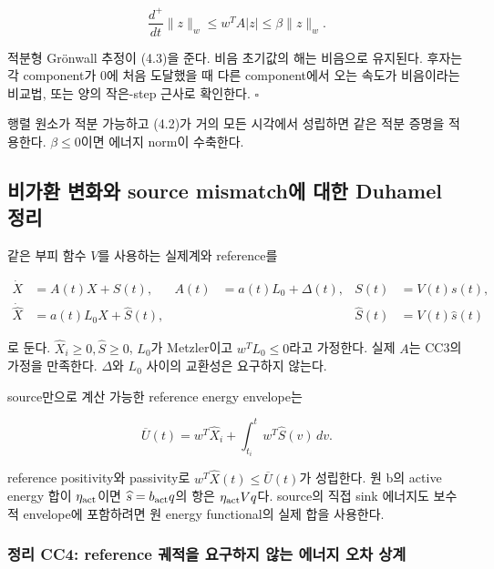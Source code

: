\[
\frac{d^+}{dt}\|z\|_w
\le w^TA|z|\le\beta\|z\|_w.
\]

적분형 Grönwall 추정이 (4.3)을 준다. 비음 초기값의 해는 비음으로 유지된다. 후자는 각 component가 0에 처음 도달했을 때 다른 component에서 오는 속도가 비음이라는 비교법, 또는 양의 작은-step 근사로 확인한다. \(\square\)

행렬 원소가 적분 가능하고 (4.2)가 거의 모든 시각에서 성립하면 같은 적분 증명을 적용한다. \(\beta\le0\)이면 에너지 norm이 수축한다.

\hypertarget{uxbe44uxac00uxd658-uxbcc0uxd654uxc640-source-mismatchuxc5d0-uxb300uxd55c-duhamel-uxc815uxb9ac}{%
\subsection{비가환 변화와 source mismatch에 대한 Duhamel 정리}\label{uxbe44uxac00uxd658-uxbcc0uxd654uxc640-source-mismatchuxc5d0-uxb300uxd55c-duhamel-uxc815uxb9ac}}

같은 부피 함수 \(V\)를 사용하는 실제계와 reference를

\[
\begin{aligned}
\dot X&=A(t)X+S(t),&
A(t)&=a(t)L_0+\Delta(t),&
S(t)&=V(t)s(t),\\
\dot{\widehat X}&=a(t)L_0\widehat X+\widehat S(t),&&&
\widehat S(t)&=V(t)\widehat s(t)
\end{aligned}
\tag{5.1}
\]

로 둔다. \(\widehat X_i\ge0,\widehat S\ge0\), \(L_0\)가 Metzler이고 \(w^TL_0\le0\)라고 가정한다. 실제 \(A\)는 CC3의 가정을 만족한다. \(\Delta\)와 \(L_0\) 사이의 교환성은 요구하지 않는다.

source만으로 계산 가능한 reference energy envelope는

\[
\boxed{
\overline U(t)=w^T\widehat X_i+
\int_{t_i}^{t}w^T\widehat S(v)\,dv.
}
\tag{5.2}
\]

reference positivity와 passivity로 \(w^T\widehat X(t)\le\overline U(t)\)가 성립한다. 원 b의 active energy 합이 \(\eta_{\rm act}\)이면 \(\widehat s=b_{\rm act}q\)의 항은 \(\eta_{\rm act}Vq\)다. source의 직접 sink 에너지도 보수적 envelope에 포함하려면 원 energy functional의 실제 합을 사용한다.

\hypertarget{uxc815uxb9ac-cc4-reference-uxada4uxc801uxc744-uxc694uxad6cuxd558uxc9c0-uxc54auxb294-uxc5d0uxb108uxc9c0-uxc624uxcc28-uxc0c1uxacc4}{%
\subsubsection{정리 CC4: reference 궤적을 요구하지 않는 에너지 오차 상계}\label{uxc815uxb9ac-cc4-reference-uxada4uxc801uxc744-uxc694uxad6cuxd558uxc9c0-uxc54auxb294-uxc5d0uxb108uxc9c0-uxc624uxcc28-uxc0c1uxacc4}}

